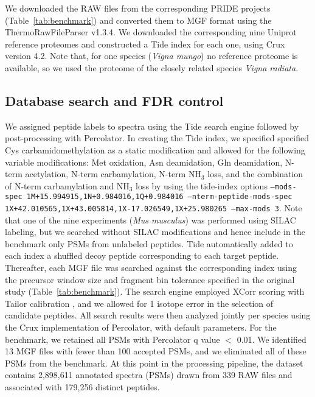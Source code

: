\documentclass{article}
\begin{document}

We downloaded the RAW files from the corresponding PRIDE projects (Table~\ref{tab:benchmark}) and converted them to MGF format using the ThermoRawFileParser v1.3.4.
We downloaded the corresponding nine Uniprot reference proteomes and constructed a Tide index for each one, using Crux version 4.2.
Note that, for one species (\textit{Vigna mungo}) no reference proteome is available, so we used the proteome of the closely related species \textit{Vigna radiata}.

\subsection*{Database search and FDR control}

\begin{sloppypar}
We assigned peptide labels to spectra using the Tide search engine followed by post-processing with Percolator.
In creating the Tide index, we specified specified Cys carbamidomethylation as a static modification and allowed for the following variable modifications: Met oxidation, Asn deamidation, Gln deamidation, N-term acetylation, N-term carbamylation, N-term NH$_{3}$ loss, and the combination of N-term carbamylation and NH$_{3}$ loss by using the tide-index options {\tt --mods-spec 1M+15.994915,\allowbreak 1N+0.984016,\allowbreak 1Q+0.984016 --nterm-peptide-mods-spec 1X+42.010565,\allowbreak 1X+43.005814,\allowbreak 1X-17.026549,\allowbreak 1X+25.980265 --max-mods 3}.
Note that one of the nine experiments (\textit{Mus musculus}) was performed using SILAC labeling, but we searched without SILAC modifications and hence include in the benchmark only PSMs from unlabeled peptides.
Tide automatically added to each index a shuffled decoy peptide corresponding to each target peptide.
Thereafter, each MGF file was searched against the corresponding index using the precursor window size and fragment bin tolerance specified in the original study (Table~\ref{tab:benchmark}).
The search engine employed XCorr scoring with Tailor calibration \cite{sulimov2020tailor}, and we allowed for 1 isotope error in the selection of candidate peptides.
All search results were then analyzed jointly per species using the Crux implementation of Percolator, with default parameters.
For the benchmark, we retained all PSMs with Percolator q value $<$ 0.01.
We identified 13 MGF files with fewer than 100 accepted PSMs, and we eliminated all of these PSMs from the benchmark.
At this point in the processing pipeline, the dataset contains 2,898,611 annotated spectra (PSMs)  drawn from 339 RAW files and associated with 179,256 distinct peptides.
\end{sloppypar}
\end{document}
